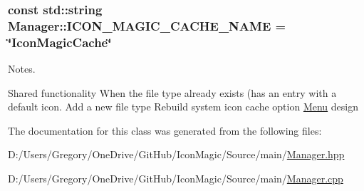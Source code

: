 \subsubsection[{I\+C\+O\+N\+\_\+\+M\+A\+G\+I\+C\+\_\+\+C\+A\+C\+H\+E\+\_\+\+N\+A\+M\+E}]{\setlength{\rightskip}{0pt plus 5cm}const std\+::string Manager\+::\+I\+C\+O\+N\+\_\+\+M\+A\+G\+I\+C\+\_\+\+C\+A\+C\+H\+E\+\_\+\+N\+A\+M\+E = \char`\"{}Icon\+Magic\+Cache\char`\"{}\hspace{0.3cm}{\ttfamily [static]}}\label{class_manager_a41184c50adeb476a9ccf55e4f3e739e9}


Notes. 

Shared functionality When the file type already exists (has an entry with a default icon. Add a new file type Rebuild system icon cache option \hyperlink{class_menu}{Menu} design 

The documentation for this class was generated from the following files\+:\begin{DoxyCompactItemize}
\item 
D\+:/\+Users/\+Gregory/\+One\+Drive/\+Git\+Hub/\+Icon\+Magic/\+Source/main/\hyperlink{_manager_8hpp}{Manager.\+hpp}\item 
D\+:/\+Users/\+Gregory/\+One\+Drive/\+Git\+Hub/\+Icon\+Magic/\+Source/main/\hyperlink{_manager_8cpp}{Manager.\+cpp}\end{DoxyCompactItemize}
